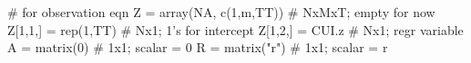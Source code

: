 \begin{Schunk}
\begin{Sinput}
 # for observation eqn
 Z = array(NA, c(1,m,TT))   # NxMxT; empty for now
 Z[1,1,] = rep(1,TT)        # Nx1; 1's for intercept
 Z[1,2,] = CUI.z            # Nx1; regr variable
 A = matrix(0)              # 1x1; scalar = 0
 R = matrix("r")            # 1x1; scalar = r
\end{Sinput}
\end{Schunk}
